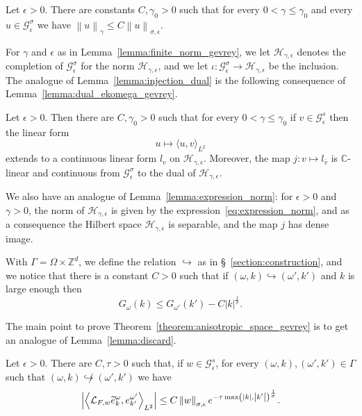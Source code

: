 \documentclass[AHL,Unicode,longabstracts,published]{cedram}
\newcommand{\n}[1]{\left\|#1\right\|}
\newcommand{\va}[1]{\left|#1\right|}
\newcommand{\clL}{\mathcal{L}}
\newcommand{\clH}{\mathcal{H}}
\newcommand{\clG}{\mathcal{G}}
\newcommand{\bbZ}{\mathbb{Z}}
\newcommand{\bbC}{\mathbb{C}}
\let\oldtilde\tilde
\renewcommand*{\tilde}[1]{\mathchoice{\widetilde{#1}}{\widetilde{#1}}{\oldtilde{#1}}{\oldtilde{#1}}}
\begin{document}
\begin{lemm}\label{lemma:finite_norm_gevrey}
Let $\epsilon > 0$. There are constants $C,\gamma_0 > 0$ such that for every $0 < \gamma \leq \gamma_0$ and every $u \in \clG_\epsilon^\sigma$ we have $\n {u}_{\gamma} \leq C\n{u}_{\sigma,\epsilon}$.
\end{lemm}

For $\gamma$ and $\epsilon$ as in Lemma~\ref{lemma:finite_norm_gevrey}, we let $\clH_{\gamma,\epsilon}$ denotes the completion of $\clG_\epsilon^\sigma$ for the norm $\clH_{\gamma,\epsilon}$, and we let $\iota : \clG_\epsilon^\sigma \to \clH_{\gamma,\epsilon}$ be the inclusion. The analogue of Lemma~\ref{lemma:injection_dual} is the following consequence of Lemma~\ref{lemma:dual_ekomega_gevrey}.

\begin{lemm}\label{lemma:dual_inclusion_gevrey}
Let $\epsilon > 0$. Then there are $C,\gamma_0 >0$ such that for every $0 < \gamma \leq \gamma_0$ if $v \in \clG_\epsilon^s$ then the linear form
\begin{equation*}
u \mapsto \langle u, v \rangle_{L^2}
\end{equation*}
extends to a continuous linear form $l_v$ on $\clH_{\gamma,\epsilon}$. Moreover, the map $j : v \mapsto l_{\bar{v}}$ is $\bbC$-linear and continuous from $\clG_\epsilon^\sigma$ to the dual of $\clH_{\gamma,\epsilon}$.
\end{lemm}

We also have an analogue of Lemma~\ref{lemma:expression_norm}: for $\epsilon > 0$ and $\gamma > 0$, the norm of $\clH_{\gamma,\epsilon}$ is given by the expression~\eqref{eq:expression_norm}, and as a consequence the Hilbert space $\clH_{\gamma,\epsilon}$ is separable, and the map $j$ has dense image.

With $\Gamma = \Omega \times \bbZ^d$, we define the relation $\hookrightarrow$ as in \S~\ref{section:construction}, and we notice that there is a constant $C > 0$ such that if $(\omega,k) \hookrightarrow (\omega',k')$ and $k$ is large enough then
\begin{equation*}
G_{\omega}(k) \leq G_{\omega'}(k') - C \va{k}^{\frac{1}{\sigma}}.
\end{equation*}

The main point to prove Theorem~\ref{theorem:anisotropic_space_gevrey} is to get an analogue of Lemma~\ref{lemma:discard}.

\begin{lemm}\label{lemma:discard_gevrey}
Let $\epsilon > 0$. There are $C, \tau >0$ such that, if $w \in \clG_\epsilon^s$, for every $(\omega,k),(\omega',k') \in \Gamma$ such that $(\omega,k) \not\hookrightarrow (\omega',k')$ we have
\begin{equation*}
\va{\left\langle \clL_{F,w} \tilde{e}_{k}^{\omega}, e_{k'}^{\omega'}\right\rangle_{L^2}} \leq C \n{w}_{\sigma,\epsilon} e^{ - \tau \max\left(\va{k},\va{k'}\right)^{\frac{1}{\sigma}}}.
\end{equation*}
\end{lemm}
\end{document}
